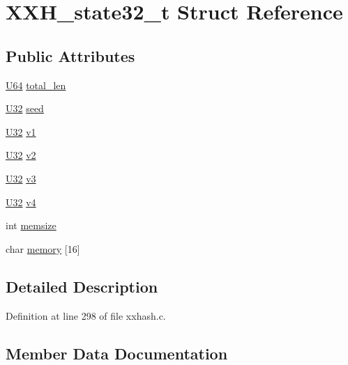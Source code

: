 \hypertarget{struct_x_x_h__state32__t}{}\section{X\+X\+H\+\_\+state32\+\_\+t Struct Reference}
\label{struct_x_x_h__state32__t}
\subsection*{Public Attributes}
\begin{DoxyCompactItemize}
\item 
\hyperlink{lz4_8c_a24c386d3758eba951eb7532fdbb45804}{U64} \hyperlink{struct_x_x_h__state32__t_a968184eb96ed6c2c47e77d0e7b2562e2}{total\+\_\+len}
\item 
\hyperlink{lz4_8c_ac3df7cf3c8cb172a588adec881447d68}{U32} \hyperlink{struct_x_x_h__state32__t_aa198d97d2ccb2e940e58c5676dd07b9f}{seed}
\item 
\hyperlink{lz4_8c_ac3df7cf3c8cb172a588adec881447d68}{U32} \hyperlink{struct_x_x_h__state32__t_a52d93caf96ab3cfa4d19faa232627402}{v1}
\item 
\hyperlink{lz4_8c_ac3df7cf3c8cb172a588adec881447d68}{U32} \hyperlink{struct_x_x_h__state32__t_a77ca5f7d04bf820d40c0b849e69c932b}{v2}
\item 
\hyperlink{lz4_8c_ac3df7cf3c8cb172a588adec881447d68}{U32} \hyperlink{struct_x_x_h__state32__t_a766430cd39ae981afd8a64d10329ec3d}{v3}
\item 
\hyperlink{lz4_8c_ac3df7cf3c8cb172a588adec881447d68}{U32} \hyperlink{struct_x_x_h__state32__t_a33ede79f26b162219c1475e39766148d}{v4}
\item 
int \hyperlink{struct_x_x_h__state32__t_a7d511c88afd3fc22cbdff9153af8424d}{memsize}
\item 
char \hyperlink{struct_x_x_h__state32__t_ade592624e217dcdd46f37634992c2f98}{memory} \mbox{[}16\mbox{]}
\end{DoxyCompactItemize}


\subsection{Detailed Description}


Definition at line 298 of file xxhash.\+c.



\subsection{Member Data Documentation}
\hypertarget{struct_x_x_h__state32__t_ade592624e217dcdd46f37634992c2f98}{}
